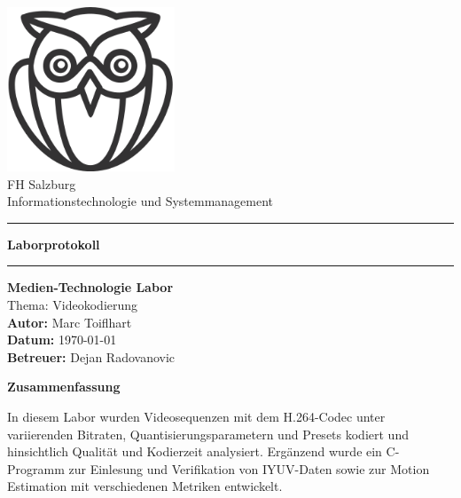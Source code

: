 \documentclass[a4paper,12pt]{article}
\begin{document}
\begin{titlepage}
    \centering
    \includegraphics[width=5cm]{Resources/logo-icon.png} \\[0.5cm] %
    FH Salzburg \\[0.2cm]
    Informationstechnologie und Systemmanagement \\[1.5cm]
    
    \hrule
    \vspace{0.4cm} %
    {\LARGE \textbf{Laborprotokoll}}
    \vspace{0.4cm}
    \hrule
    \vspace{1.5cm} %

    {\Large \textbf{Medien-Technologie Labor}} \\[0.2cm]
    {\Large Thema: Videokodierung} \\[1cm]
    
    \textbf{Autor:} Marc Toiflhart \\[0.2cm]
    \textbf{Datum:} \today \\[0.2cm]
    \textbf{Betreuer:} Dejan Radovanovic

    \vfill
\end{titlepage}
\newpage

\begin{center}
    \textbf{Zusammenfassung}
\end{center}
In diesem Labor wurden Videosequenzen mit dem H.264-Codec unter variierenden Bitraten, Quantisierungsparametern und Presets kodiert und hinsichtlich Qualität und Kodierzeit analysiert. Ergänzend wurde ein C-Programm zur Einlesung und Verifikation von IYUV-Daten sowie zur Motion Estimation mit verschiedenen Metriken entwickelt.

\tableofcontents
\newpage

\listoffigures
\newpage

\listoftables
\newpage
\end{document}
